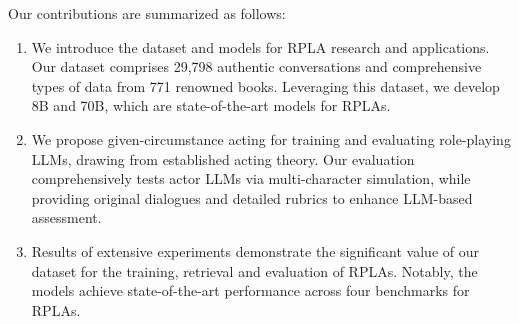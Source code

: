 Our contributions are summarized as follows:
\begin{enumerate} 
    \item We introduce the \method dataset and models for RPLA research and applications. Our dataset comprises 29,798 authentic conversations and comprehensive types of data from 771 renowned books. Leveraging this dataset, we develop \method 8B and \method 70B, which are state-of-the-art models for RPLAs. 
    \item We propose given-circumstance acting for training and evaluating role-playing LLMs, drawing from established acting theory. Our evaluation comprehensively tests actor LLMs via multi-character simulation, while providing original dialogues and detailed rubrics to enhance LLM-based assessment. 
    \item Results of extensive experiments demonstrate the significant value of our dataset for the training, retrieval and evaluation of RPLAs. Notably, the \method models achieve state-of-the-art performance across four benchmarks for RPLAs. 
\end{enumerate}
